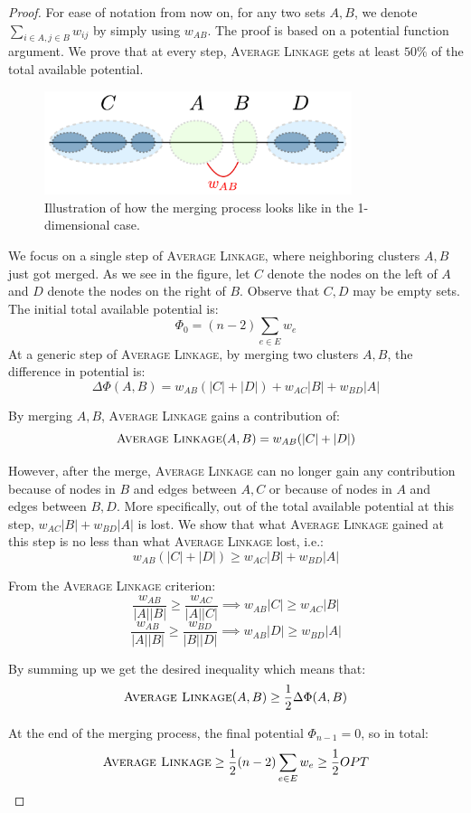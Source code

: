 \documentclass{article}
\begin{document}
\begin{proof}
For ease of notation from now on, for any two sets $A,B$, we denote $\sum_{i\in A,j\in B}w_{ij}$ by simply using $w_{AB}$.
The proof is based on a potential function argument. We prove that at every step, \textsc{Average Linkage} gets at least $50\%$ of the total available potential.

\begin{figure}[h!]
	\centering
	\includegraphics[width=9cm]{merging}
        	\caption{Illustration of how the merging process looks like in the 1-dimensional case.}
\end{figure}

We focus on a single step of \textsc{Average Linkage}, where neighboring clusters $A,B$ just got merged. As we see in the figure, let $C$ denote the nodes on the left of $A$ and $D$ denote the nodes on the right of $B$. Observe that $C,D$ may be empty sets. The initial total available potential is:
\[
\Phi_0 = (n-2)\sum_{e\in E}w_e
\]
 At a generic step of \textsc{Average Linkage}, by merging two clusters $A,B$, the difference in potential is:
\[
\Delta\Phi(A,B) = w_{AB}(|C|+|D|) + w_{AC}|B|+ w_{BD}|A| 
\]

By merging $A,B$, \textsc{Average Linkage} gains a contribution of:
\[
\textsc{Average Linkage}(A,B) = w_{AB}(|C|+|D|)
\]

However, after the merge, \textsc{Average Linkage} can no longer gain any contribution because of nodes in $B$ and edges between $A,C$ or because of nodes in $A$ and edges between $B,D$. More specifically, out of the total available potential at this step, $w_{AC}|B| + w_{BD}|A|$ is lost. We show that what \textsc{Average Linkage} gained at this step is no less than what \textsc{Average Linkage} lost, i.e.:
\[
w_{AB}(|C|+|D|) \ge w_{AC}|B| + w_{BD}|A|
\]

From the \textsc{Average Linkage} criterion:
\[
\dfrac{w_{AB}}{|A||B|}\ge \dfrac{w_{AC}}{|A||C|}\implies w_{AB}|C| \ge w_{AC}|B|
\]
\[
\dfrac{w_{AB}}{|A||B|}\ge \dfrac{w_{BD}}{|B||D|}\implies w_{AB}|D| \ge w_{BD}|A|
\]

By summing up we get the desired inequality which means that:
\[
\textsc{Average Linkage}(A,B)\ge \dfrac12 \Delta\Phi(A,B)
\]

At the end of the merging process, the final potential $\Phi_{n-1} = 0$, so in total:
\[
\textsc{Average Linkage}\ge \dfrac12 (n-2)\sum_{e\in E}w_e\ge \dfrac12 OPT
\]

\end{proof}
\end{document}
